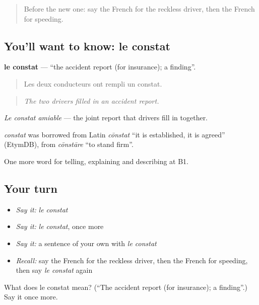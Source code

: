 \begin{quote}
Before the new one: say the French for the reckless driver, then the French for speeding.
\end{quote}

\subsection*{You'll want to know: le constat}
\textbf{le constat} — \textquotedblleft{}the accident report (for insurance); a finding\textquotedblright{}.

\begin{quote}
Les deux conducteurs ont rempli un constat.
\end{quote}

\begin{quote}
\emph{The two drivers filled in an accident report.}
\end{quote}

\emph{Le constat amiable} — the joint report that drivers fill in together.

\begin{cousinweb}
\emph{constat} was borrowed from Latin \emph{cōnstat} \textquotedblleft{}it is established, it is agreed\textquotedblright{} (EtymDB), from \emph{cōnstāre} \textquotedblleft{}to stand firm\textquotedblright{}.
\end{cousinweb}

\begin{grammarlens}[title={What you've built}]
One more word for telling, explaining and describing at B1.
\end{grammarlens}

\subsection*{Your turn}
\begin{itemize}
\raggedright
  \item \emph{Say it:} \emph{le constat}
  \item \emph{Say it:} \emph{le constat}, once more
  \item \emph{Say it:} a sentence of your own with \emph{le constat}
  \item \emph{Recall:} say the French for the reckless driver, then the French for speeding, then say \emph{le constat} again
\end{itemize}

\begin{tcolorbox}[breakable,colback=teal!4,colframe=teal!35!black,title={Before you move on}]
What does le constat mean? (\textquotedblleft{}The accident report (for insurance); a finding\textquotedblright{}.) Say it once more.
\end{tcolorbox}
